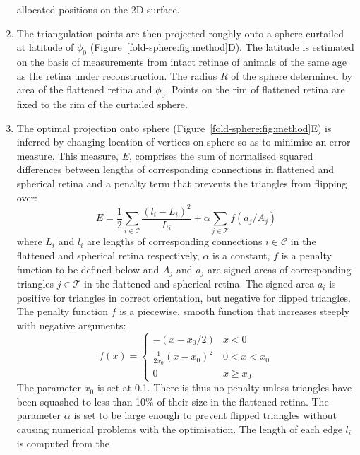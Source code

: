 \documentclass[10pt]{article}
\begin{document}
\begin{enumerate}
  allocated positions on the 2D surface.
\item The triangulation points are then projected roughly onto a
  sphere curtailed at latitude of $\phi_0$
  (Figure~\ref{fold-sphere:fig:method}D). The latitude is estimated
  on the basis of measurements from intact retinae of animals of the
 same age as the retina under reconstruction. The radius $R$ of the
  sphere determined by area of the flattened retina and $\phi_0$.
  Points on the rim of flattened retina are fixed to the rim of the
  curtailed sphere. 
\item The optimal projection onto sphere
  (Figure~\ref{fold-sphere:fig:method}E) is inferred by changing
  location of vertices on sphere so as to minimise an error
  measure. This measure, $E$, comprises the sum of normalised squared
  differences between lengths of corresponding connections in
  flattened and spherical retina and a penalty term that prevents the
  triangles from flipping over:
  \begin{equation}
    E = \frac{1}{2} \sum_{i\in\mathcal{C}} \frac{(l_i - L_i)^2}{L_i}  
    + \alpha\sum_{j\in\mathcal{T}} f(a_j/A_j)
  \end{equation}
  where $L_i$ and $l_i$ are lengths of corresponding connections
  $i\in\mathcal{C}$ in the flattened and spherical retina
  respectively, $\alpha$ is a constant, $f$ is a penalty function to
  be defined below and $A_j$ and $a_j$ are signed areas of
  corresponding triangles $j\in\mathcal{T}$ in the flattened and
  spherical retina.  The signed area $a_i$ is positive for triangles in
  correct orientation, but negative for flipped triangles. The penalty
  function $f$ is a piecewise, smooth function that increases steeply
  with negative arguments:
  \begin{equation}
    \label{retistruct_plos:eq:1}
    f(x) = \left\{
        \begin{array}{ll}
          -(x - x_0/2) & x < 0 \\
          \frac{1}{2x_0}(x - x_0)^2 & 0 < x <x_0 \\
          0 & x \ge x_0
          \end{array} \right.
  \end{equation}
  The parameter $x_0$ is set at 0.1. There is thus no penalty unless
  triangles have been squashed to less than 10\% of their size in the
  flattened retina.  The parameter $\alpha$ is set to be large enough
  to prevent flipped triangles without causing numerical problems with
  the optimisation. The length of each edge $l_i$ is computed from the

\end{enumerate}
\end{document}
